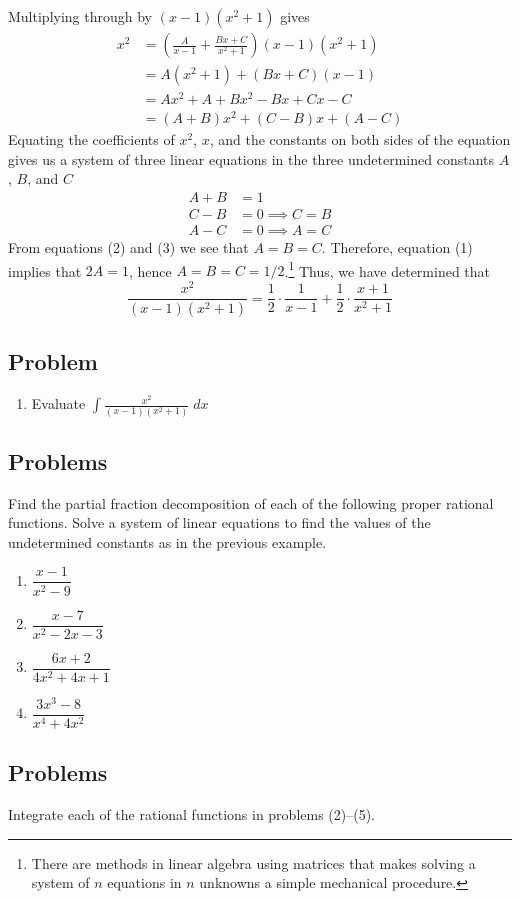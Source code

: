 \documentclass[12pt,letterpaper,fleqn]{article}
\theoremstyle{definition}
\begin{document}
Multiplying through by $(x-1)(x^2 + 1)$ gives
\begin{align*}
 x^2 & = \left(\frac{A}{x-1} + \frac{Bx + C}{x^2 + 1}\right)(x-1)(x^2 + 1) \\[1ex]
     & = A(x^2 + 1) + (Bx + C)(x-1)                                        \\[1ex]
     & = Ax^2 + A + Bx^2 - Bx + Cx - C                                     \\[1ex]
     & = (A + B)x^2 + (C - B)x + (A - C)
\end{align*}
Equating the coefficients of $x^2$, $x$, and the constants on both sides of the equation gives us a system of three linear equations in the three undetermined constants $A$, $B$, and $C$
\begin{align}
 A + B & = 1                \\
 C - B & = 0 \implies C = B \\
 A - C & = 0 \implies A = C
\end{align}
From equations (2) and (3) we see that $A = B = C$. Therefore, equation (1) implies that $2A = 1$, hence $A = B = C = 1/2$.\footnote{There are methods in linear algebra using matrices that makes solving a system of $n$ equations in $n$ unknowns a simple mechanical procedure.} Thus, we have determined that
\begin{equation*}
 \frac{x^2}{(x-1)(x^2 + 1)} = \frac{1}{2}\cdot\frac{1}{x-1} + \frac{1}{2}\cdot\frac{x + 1}{x^2 + 1}
\end{equation*}
\subsection*{Problem}
\begin{enumerate}
 \item Evaluate $\displaystyle\int\frac{x^2}{(x-1)(x^2 + 1)}\;dx$
\end{enumerate}
\subsection*{Problems}
Find the partial fraction decomposition of each of the following proper rational functions. Solve a system of linear equations to find the values of the undetermined constants as in the previous example.
\begin{enumerate}[resume]
 \item $\dfrac{x - 1}{x^2 - 9}$
 \item $\dfrac{x - 7}{x^2 - 2x - 3}$
 \item $\dfrac{6x + 2}{4x^2 + 4x + 1}$
 \item $\dfrac{3x^3 - 8}{x^4 + 4x^2}$
\end{enumerate}
\subsection*{Problems}
Integrate each of the rational functions in problems (2)--(5).
\end{document}
